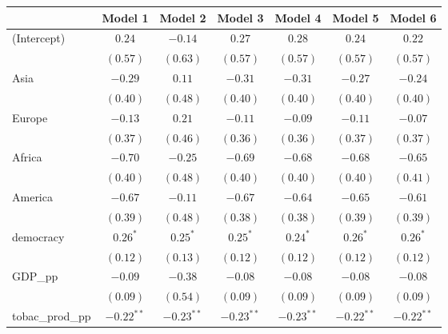 
\begin{table}[!h]
\begin{center}
\begin{tabular}{l c c c c c c }
\toprule
 & Model 1 & Model 2 & Model 3 & Model 4 & Model 5 & Model 6 \\
\midrule
(Intercept)             & $0.24$       & $-0.14$      & $0.27$       & $0.28$       & $0.24$       & $0.22$       \\
                        & $(0.57)$     & $(0.63)$     & $(0.57)$     & $(0.57)$     & $(0.57)$     & $(0.57)$     \\
Asia                    & $-0.29$      & $0.11$       & $-0.31$      & $-0.31$      & $-0.27$      & $-0.24$      \\
                        & $(0.40)$     & $(0.48)$     & $(0.40)$     & $(0.40)$     & $(0.40)$     & $(0.40)$     \\
Europe                  & $-0.13$      & $0.21$       & $-0.11$      & $-0.09$      & $-0.11$      & $-0.07$      \\
                        & $(0.37)$     & $(0.46)$     & $(0.36)$     & $(0.36)$     & $(0.37)$     & $(0.37)$     \\
Africa                  & $-0.70$      & $-0.25$      & $-0.69$      & $-0.68$      & $-0.68$      & $-0.65$      \\
                        & $(0.40)$     & $(0.48)$     & $(0.40)$     & $(0.40)$     & $(0.40)$     & $(0.41)$     \\
America                 & $-0.67$      & $-0.11$      & $-0.67$      & $-0.64$      & $-0.65$      & $-0.61$      \\
                        & $(0.39)$     & $(0.48)$     & $(0.38)$     & $(0.38)$     & $(0.39)$     & $(0.39)$     \\
democracy               & $0.26^{*}$   & $0.25^{*}$   & $0.25^{*}$   & $0.24^{*}$   & $0.26^{*}$   & $0.26^{*}$   \\
                        & $(0.12)$     & $(0.13)$     & $(0.12)$     & $(0.12)$     & $(0.12)$     & $(0.12)$     \\
GDP\_pp                 & $-0.09$      & $-0.38$      & $-0.08$      & $-0.08$      & $-0.08$      & $-0.08$      \\
                        & $(0.09)$     & $(0.54)$     & $(0.09)$     & $(0.09)$     & $(0.09)$     & $(0.09)$     \\
tobac\_prod\_pp         & $-0.22^{**}$ & $-0.23^{**}$ & $-0.23^{**}$ & $-0.23^{**}$ & $-0.22^{**}$ & $-0.22^{**}$ \\

\end{tabular}
\end{center}
\end{table}
